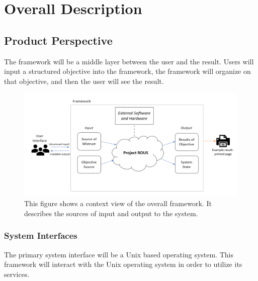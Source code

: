\documentclass[draftclsnofoot, onecolumn, compsoc, 10pt]{IEEEtran}
\begin{document}

\section{Overall Description}
\subsection{Product Perspective}
The framework will be a middle layer between the user and the result. Users will input a structured objective into the framework, the framework will organize on that objective, and then the user will see the result. 


\begin{figure}[!htb]
\centering
	\includegraphics[width=1.0\textwidth]{img_context}
	\caption{This figure shows a context view of the overall framework. It describes the sources of input and output to the system.}
  
\end{figure}

\subsubsection{System Interfaces}
The primary system interface will be a Unix based operating system. This framework will interact with the Unix operating system in order to utilize its services. 
\end{document}
